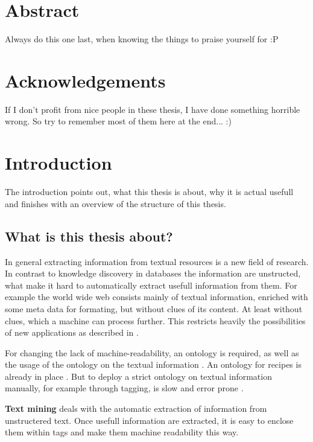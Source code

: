 \documentclass[12pt, twoside]{report}
\begin{document}
\chapter*{Abstract}
Always do this one last, when knowing the things to praise  yourself for :P

\chapter*{Acknowledgements}
If I don't profit from nice people in these thesis, I have done something horrible wrong. So try to remember most of them here at the end... :)

\tableofcontents



\chapter{Introduction}

The introduction points out, what this thesis is about, why it is actual usefull and finishes with an overview of the structure of this thesis.

\section{What is this thesis about?}
In general extracting information from textual resources is a new field of research. In contrast to knowledge discovery in databases the information are unstructed, what make it hard to automatically extract usefull information from them. For example the world wide web consists mainly of textual information, enriched with some meta data for formating, but without clues of its content. At least without clues, which a machine can process further. This restricts heavily the possibilities of new applications as described in \parencite{semanticWeb}.

For changing the lack of machine-readability, an ontology is required, as well as the usage of the ontology on the textual information \parencite{semanticWeb}. An ontology for recipes is already in place \parencite{schemaRecipe}. But to deploy a strict ontology on textual information manually, for example through tagging, is slow and error prone \parencite{manualTagging}.

\textbf{Text mining} deals with the automatic extraction of information from unstructered text. Once usefull information are extracted, it is easy to enclose them within tags and make them machine readability this way.
\end{document}
